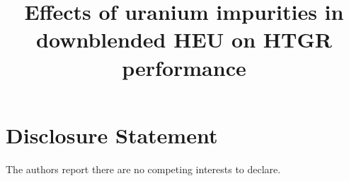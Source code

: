 \documentclass[review]{../nseJournal}
\begin{document}
\title{Effects of uranium impurities in downblended HEU on  
HTGR performance}




%

\titlePage


\linenumbers







\section*{Disclosure Statement}
The authors report there are no competing interests 
to declare. 




%
\end{document}
